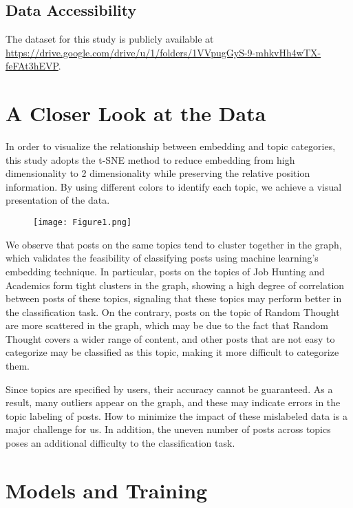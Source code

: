 \documentclass[a4paper, twocolumn]{article}
\begin{document}
\subsection{Data Accessibility}

The dataset for this study is publicly available at \href{https://drive.google.com/drive/u/1/folders/1VVpugGyS-9-mhkvHh4wTX-feFAt3hEVP}{https://drive.google.com/drive/u/1/folders/1VVpugGyS-9-mhkvHh4wTX-feFAt3hEVP}.

\section{A Closer Look at the Data}

In order to visualize the relationship between embedding and topic categories, this study adopts the t-SNE method to reduce embedding from high dimensionality to 2 dimensionality while preserving the relative position information. By using different colors to identify each topic, we achieve a visual presentation of the data.

\begin{figure}[ht]
\begin{center}
\texttt{[image: Figure1.png]}
\end{center}
\end{figure}

We observe that posts on the same topics tend to cluster together in the graph, which validates the feasibility of classifying posts using machine learning's embedding technique. In particular, posts on the topics of Job Hunting and Academics form tight clusters in the graph, showing a high degree of correlation between posts of these topics, signaling that these topics may perform better in the classification task. On the contrary, posts on the topic of Random Thought are more scattered in the graph, which may be due to the fact that Random Thought  covers a wider range of content, and other posts that are not easy to categorize may be classified as this topic, making it more difficult to categorize them.

Since topics are specified by users, their accuracy cannot be guaranteed. As a result, many outliers appear on the graph, and these may indicate errors in the topic labeling of posts. How to minimize the impact of these mislabeled data is a major challenge for us. In addition, the uneven number of posts across topics poses an additional difficulty to the classification task.

\section{Models and Training}
\end{document}
